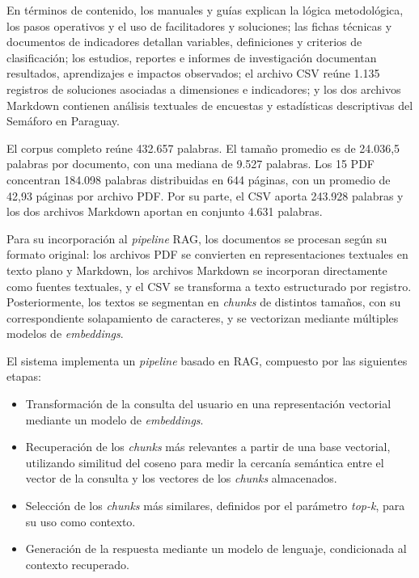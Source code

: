 \documentclass{article}
\begin{document}
En términos de contenido, los manuales y guías explican la lógica metodológica, los pasos operativos y el uso de facilitadores y soluciones; las fichas técnicas y documentos de indicadores detallan variables, definiciones y criterios de clasificación; los estudios, reportes e informes de investigación documentan resultados, aprendizajes e impactos observados; el archivo CSV reúne 1.135 registros de soluciones asociadas a dimensiones e indicadores; y los dos archivos Markdown contienen análisis textuales de encuestas y estadísticas descriptivas del Semáforo en Paraguay.

El corpus completo reúne 432.657 palabras. El tamaño promedio es de 24.036,5 palabras por documento, con una mediana de 9.527 palabras. Los 15 PDF concentran 184.098 palabras distribuidas en 644 páginas, con un promedio de 42,93 páginas por archivo PDF. Por su parte, el CSV aporta 243.928 palabras y los dos archivos Markdown aportan en conjunto 4.631 palabras.

Para su incorporación al \textit{pipeline} RAG, los documentos se procesan según su formato original: los archivos PDF se convierten en representaciones textuales en texto plano y Markdown, los archivos Markdown se incorporan directamente como fuentes textuales, y el CSV se transforma a texto estructurado por registro. Posteriormente, los textos se segmentan en \textit{chunks} de distintos tamaños, con su correspondiente solapamiento de caracteres, y se vectorizan mediante múltiples modelos de \textit{embeddings}.

El sistema implementa un \textit{pipeline} basado en RAG, compuesto por las siguientes etapas:

\begin{itemize}

\item Transformación de la consulta del usuario en una representación vectorial mediante un modelo de \textit{embeddings}.

\item Recuperación de los \textit{chunks} más relevantes a partir de una base vectorial, utilizando similitud del coseno para medir la cercanía semántica entre el vector de la consulta y los vectores de los \textit{chunks} almacenados.

\item Selección de los \textit{chunks} más similares, definidos por el parámetro \textit{top-k}, para su uso como contexto.

\item Generación de la respuesta mediante un modelo de lenguaje, condicionada al contexto recuperado.

\end{itemize}
\end{document}
